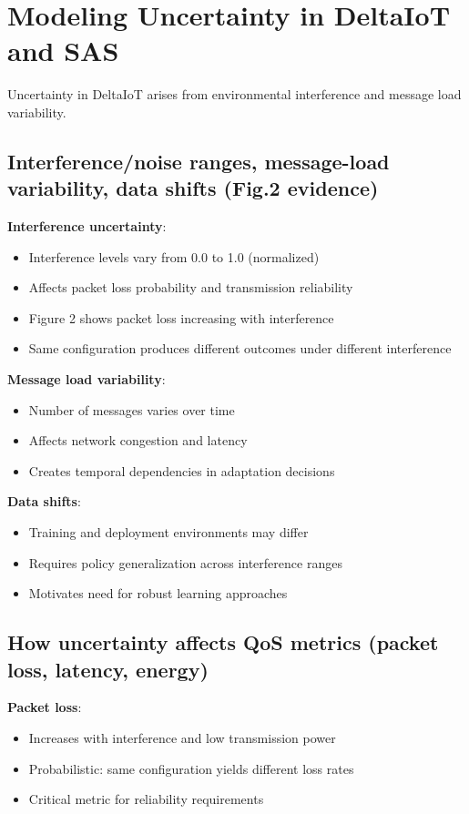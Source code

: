 \documentclass[11pt,a4paper]{article}
\begin{document}
\section{Modeling Uncertainty in DeltaIoT and SAS}

Uncertainty in DeltaIoT arises from environmental interference and message load variability.

\subsection{Interference/noise ranges, message-load variability, data shifts (Fig.2 evidence)}

\textbf{Interference uncertainty}:
\begin{itemize}
    \item Interference levels vary from 0.0 to 1.0 (normalized)
    \item Affects packet loss probability and transmission reliability
    \item Figure 2 shows packet loss increasing with interference
    \item Same configuration produces different outcomes under different interference
\end{itemize}

\textbf{Message load variability}:
\begin{itemize}
    \item Number of messages varies over time
    \item Affects network congestion and latency
    \item Creates temporal dependencies in adaptation decisions
\end{itemize}

\textbf{Data shifts}:
\begin{itemize}
    \item Training and deployment environments may differ
    \item Requires policy generalization across interference ranges
    \item Motivates need for robust learning approaches
\end{itemize}

\subsection{How uncertainty affects QoS metrics (packet loss, latency, energy)}

\textbf{Packet loss}:
\begin{itemize}
    \item Increases with interference and low transmission power
    \item Probabilistic: same configuration yields different loss rates
    \item Critical metric for reliability requirements
\end{itemize}
\end{document}
